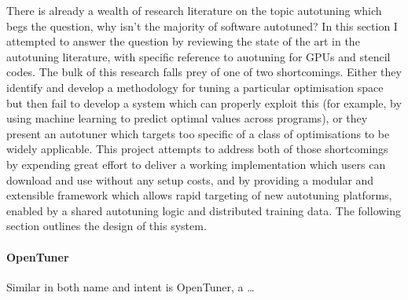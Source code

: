 \documentclass[nonatbib,preprint,9pt]{sigplanconf}
\begin{document}

There is already a wealth of research literature on the topic
autotuning which begs the question, why isn't the majority of software
autotuned? In this section I attempted to answer the question by
reviewing the state of the art in the autotuning literature, with
specific reference to auotuning for GPUs and stencil codes. The bulk
of this research falls prey of one of two shortcomings. Either they
identify and develop a methodology for tuning a particular
optimisation space but then fail to develop a system which can
properly exploit this (for example, by using machine learning to
predict optimal values across programs), or they present an autotuner
which targets too specific of a class of optimisations to be widely
applicable. This project attempts to address both of those
shortcomings by expending great effort to deliver a working
implementation which users can download and use without any setup
costs, and by providing a modular and extensible framework which
allows rapid targeting of new autotuning platforms, enabled by a
shared autotuning logic and distributed training data. The following
section outlines the design of this system.


\paragraph{OpenTuner} Similar in both name and intent is OpenTuner, a
\ldots
\end{document}
